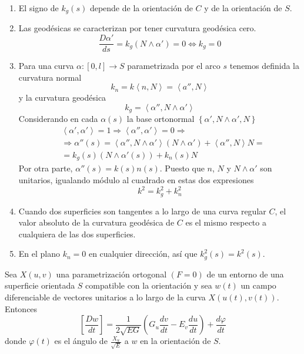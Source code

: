 \begin{remark}
    \hfill
    \begin{enumerate}
        \item El signo de $k_g(s)$ depende de la orientación de $C$ y de la orientación de $S$.
        \item Las geodésicas se caracterizan por tener curvatura geodésica cero.
              $$\frac{D\alpha'}{ds} = k_g(N \land \alpha') = 0 \Leftrightarrow k_g = 0$$
        \item Para una curva $\alpha : [0, l] \to S$ parametrizada por el arco $s$ tenemos definida la curvatura normal
              $$k_n = k \left\langle n, N \right\rangle = \left\langle a'', N \right\rangle$$
              y la curvatura geodésica
              $$k_g = \left\langle \alpha'', N \land \alpha' \right\rangle$$
              Considerando en cada $\alpha(s)$ la base ortonormal $\left\{ \alpha', N \land \alpha', N \right\}$
              \begin{align*}
                   & \left\langle \alpha', \alpha' \right\rangle = 1 \Rightarrow \left\langle \alpha'', \alpha' \right\rangle = 0 \Rightarrow                      \\
                   & \Rightarrow \alpha''(s) = \left\langle \alpha'', N \land \alpha' \right\rangle (N \land \alpha') + \left\langle \alpha'', N \right\rangle N = \\
                   & = k_g(s) (N \land \alpha'(s)) + k_n(s)N
              \end{align*}
              Por otra parte, $\alpha''(s) = k(s)n(s)$.
              Puesto que $n$, $N$ y $N \land \alpha'$ son unitarios, igualando módulo al cuadrado en estas dos expresiones
              $$k^2 = k_g^2 + k_n^2$$
        \item Cuando dos superficies son tangentes a lo largo de una curva regular $C$, el valor absoluto de la curvatura geodésica de $C$ es el mismo respecto a cualquiera de las dos superficies.
        \item En el plano $k_n = 0$ en cualquier dirección, así que $k_g^2(s) = k^2(s)$.
    \end{enumerate}
\end{remark}

\begin{proposition}
    Sea $X(u, v)$ una parametrización ortogonal $(F=0)$ de un entorno de una superficie orientada $S$ compatible con la orientación y sea $w(t)$ un campo diferenciable de vectores unitarios a lo largo de la curva $X(u(t), v(t))$. Entonces
    $$\left[ \frac{Dw}{dt} \right] = \frac{1}{2\sqrt{EG}} \left( G_u \frac{dv}{dt} - E_v \frac{du}{dt} \right) + \frac{d\varphi}{dt}$$
    donde $\varphi(t)$ es el ángulo de $\frac{X_u}{\sqrt{E}}$ a $w$ en la orientación de $S$.
\end{proposition}

